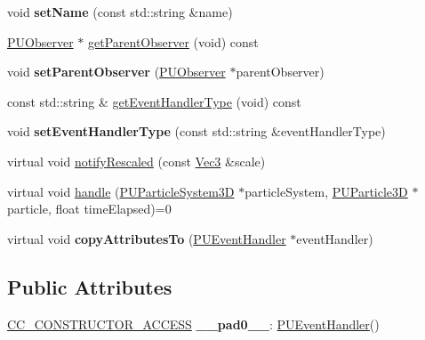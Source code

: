 \begin{DoxyCompactItemize}
\mbox{\label{classPUEventHandler_a55a0c096c746bd963fb733eb3e5457ef}} 
void {\bfseries set\+Name} (const std\+::string \&name)
\item 
\hyperlink{classPUObserver}{P\+U\+Observer} $\ast$ \hyperlink{classPUEventHandler_a1934c2484b1127c94fbf235bbb6af892}{get\+Parent\+Observer} (void) const
\item 
\mbox{\label{classPUEventHandler_a0e044260fa91e1f17abce627c4231cac}} 
void {\bfseries set\+Parent\+Observer} (\hyperlink{classPUObserver}{P\+U\+Observer} $\ast$parent\+Observer)
\item 
const std\+::string \& \hyperlink{classPUEventHandler_ae1025b7365621e99b2b8fa257ff4583a}{get\+Event\+Handler\+Type} (void) const
\item 
\mbox{\label{classPUEventHandler_aa3ac7481332d09a96b15ee6b153d68f7}} 
void {\bfseries set\+Event\+Handler\+Type} (const std\+::string \&event\+Handler\+Type)
\item 
virtual void \hyperlink{classPUEventHandler_a3bd376b30698822a875d2c2c9b19075f}{notify\+Rescaled} (const \hyperlink{classVec3}{Vec3} \&scale)
\item 
virtual void \hyperlink{classPUEventHandler_a760172609708c65548dcac364c9b3b9c}{handle} (\hyperlink{classPUParticleSystem3D}{P\+U\+Particle\+System3D} $\ast$particle\+System, \hyperlink{structPUParticle3D}{P\+U\+Particle3D} $\ast$particle, float time\+Elapsed)=0
\item 
\mbox{\label{classPUEventHandler_ad342b636bf44baa5701c825b1b5e0e11}} 
virtual void {\bfseries copy\+Attributes\+To} (\hyperlink{classPUEventHandler}{P\+U\+Event\+Handler} $\ast$event\+Handler)
\end{DoxyCompactItemize}
\subsection*{Public Attributes}
\begin{DoxyCompactItemize}
\item 
\mbox{\label{classPUEventHandler_a82ccecc7953a06e196f08ffcf1ff425c}} 
\hyperlink{_2cocos2d_2cocos_2base_2ccConfig_8h_a25ef1314f97c35a2ed3d029b0ead6da0}{C\+C\+\_\+\+C\+O\+N\+S\+T\+R\+U\+C\+T\+O\+R\+\_\+\+A\+C\+C\+E\+SS} {\bfseries \+\_\+\+\_\+pad0\+\_\+\+\_\+}\+: \hyperlink{classPUEventHandler}{P\+U\+Event\+Handler}()
\end{DoxyCompactItemize}
